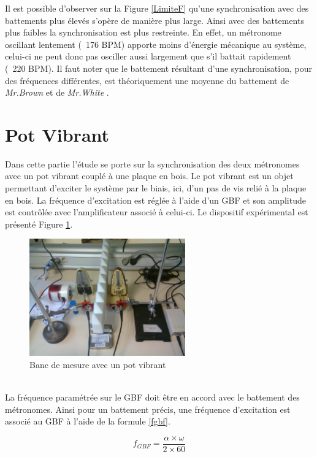 \documentclass[a4paper,11pt]{report}
\begin{document}
Il est possible d'observer sur la Figure \ref{LimiteF} qu'une synchronisation avec des battements plus élevés s'opère de manière plus large. Ainsi avec des battements plus faibles la synchronisation est plus restreinte. En effet, un métronome oscillant lentement (~176 BPM) apporte moins d'énergie mécanique au système, celui-ci ne peut donc pas osciller aussi largement que s'il battait rapidement (~220 BPM). Il faut noter que le battement résultant d'une synchronisation, pour des fréquences différentes, est théoriquement une moyenne du battement de {\it Mr.Brown} et de {\it Mr.White} \cite{piko}.

\section{Pot Vibrant}
Dans cette partie l'étude se porte sur la synchronisation des deux métronomes avec un pot vibrant couplé à une plaque en bois. Le pot vibrant est un objet permettant d'exciter le système par le biais, ici, d'un pas de vis relié à la plaque en bois. La fréquence d'excitation est réglée à l'aide d'un GBF et son amplitude est contrôlée avec l'amplificateur associé à celui-ci. Le dispositif expérimental est présenté Figure \ref{BancPot}.\\
\begin{figure}[h]
\centering
\includegraphics[width=0.6\textwidth]{Bancpotvibrant}
\caption{Banc de mesure avec un pot vibrant}\label{BancPot}
\end{figure}\\
La fréquence paramétrée sur le GBF doit être en accord avec le battement des métronomes. Ainsi pour un battement précis, une fréquence d'excitation est associé au GBF à l'aide de la formule \ref{fgbf}.

\begin{equation}
f_{GBF}=\frac{\alpha \times \omega}{2 \times 60}
\label{fgbf}
\end{equation}
\end{document}

